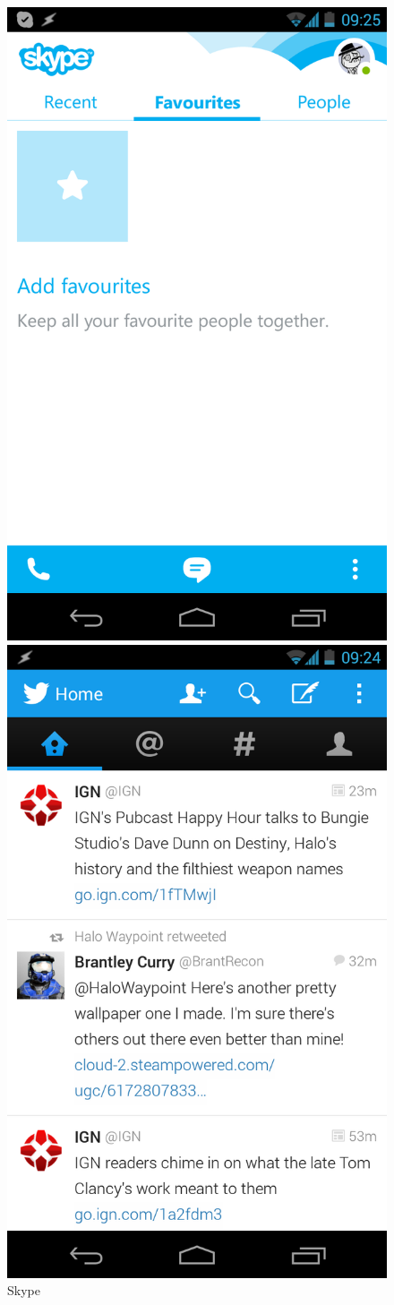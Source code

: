 \begin{figure}[H]
\begin{minipage}[b]{0.5\columnwidth}
\centering
\includegraphics[width=0.7\columnwidth]{img/screenshots/twitter.png}
\caption{Skype\label{fig:skype}}
\end{minipage}
\hspace{0.5cm}
\begin{minipage}[b]{0.5\columnwidth}
\centering
\includegraphics[width=0.7\columnwidth]{img/screenshots/skype.png}

\end{minipage}
\end{figure}
